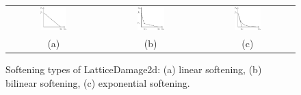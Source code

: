 \documentclass[a4paper]{article}
\begin{document}
\begin{figure}[!htb]
\begin{tabular}{ccc}
\includegraphics[width=0.3\textwidth]{figSofteningLatticeDamage2da} & \includegraphics[width=0.3\textwidth]{figSofteningLatticeDamage2db} & \includegraphics[width=0.3\textwidth]{figSofteningLatticeDamage2dc}\\
(a) & (b) & (c)
\end{tabular}
  \caption{Softening types of LatticeDamage2d: (a) linear softening, (b) bilinear softening, (c) exponential softening.}
  \label{SofteningLatticeDamage2d}
\end{figure}
\end{document}
